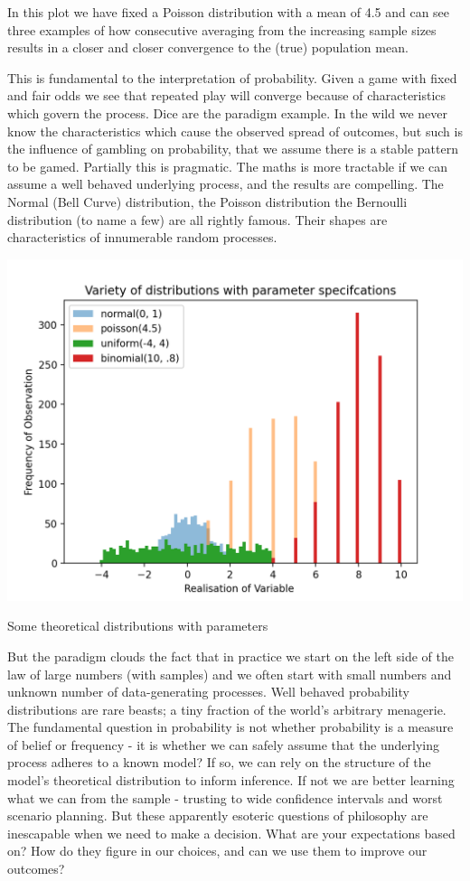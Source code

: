 \documentclass{tufte-handout}
\begin{document}
\noindent In this plot we have fixed a Poisson distribution with a mean of 4.5 and can see three examples of how consecutive averaging from the increasing sample sizes results in a closer and closer convergence to the (true) population mean.
\linebreak

\noindent  This is fundamental to the interpretation of probability. Given a game with fixed and fair odds we see that repeated play will converge because of characteristics which govern the process. Dice are the paradigm example.  In the wild we never know the characteristics which cause the observed spread of outcomes, but such is the influence of gambling on probability, that we assume there is a stable pattern to be gamed. Partially this is pragmatic. The maths is more tractable if we can assume a well behaved underlying process, and the results are compelling. The Normal (Bell Curve) distribution, the Poisson distribution the Bernoulli distribution (to name a few) are all rightly famous. Their shapes are characteristics of innumerable random processes. 
\linebreak
\begin{marginfigure}
  \includegraphics[width=\linewidth]{../Expectation/Plots/variety_of_distributions.png}
  \caption{Some theoretical distributions with parameters}
\end{marginfigure}

\noindent But the paradigm clouds the fact that in practice we start on the left side of the law of large numbers (with samples) and we often start with small numbers and unknown number of data-generating processes. 
Well behaved probability distributions are rare beasts; a tiny fraction of the world's arbitrary menagerie. The fundamental question in probability is not whether probability is a measure of belief or frequency - it is whether we can safely assume that the underlying process adheres to a known model? If so, we can rely on the structure of the model's theoretical distribution to inform inference. If not we are better learning what we can from the sample - trusting to wide confidence intervals and worst scenario planning. But these apparently esoteric questions of philosophy are inescapable when we need to make a decision. What are your expectations based on? How do they figure in our choices, and can we use them to improve our outcomes? 
\end{document}
